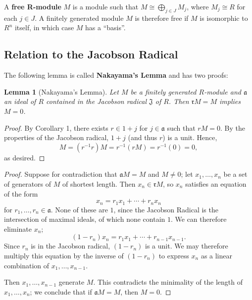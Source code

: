 \documentclass[11pt]{article}
\newtheorem{lemma}{Lemma}
\begin{document}
A \textbf{free R-module} $M$ is a module such that $M \cong \bigoplus_{j \in J} M_{j}$, where $M_{j} \cong R$ for each $j \in J$. A finitely generated module $M$ is therefore free if $M$ is isomorphic to $R^{n}$ itself, in which case $M$ has a ``basis''.

\subsection{Relation to the Jacobson Radical}


The following lemma is called \textbf{Nakayama's Lemma} and has two proofs:

\begin{adjustwidth}{0.5cm}{}
	\begin{lemma}[Nakayama's Lemma]
		Let $M$ be a finitely generated $R$-module and $\mathfrak{a}$ an ideal of $R$ contained in the Jacobson radical $\mathfrak{J}$ of $R$. Then $\mathfrak{r}M = M$ implies $M = 0$.
	\end{lemma}
	\begin{proof}
		By Corollary 1, there exists $r \in 1 + j$ for $j \in \mathfrak{a}$ such that $rM = 0$. By the properties of the Jacobson radical, $1 + j$ (and thus $r$) is a unit. Hence,
		\[
			M = (r^{-1}r)M = r^{-1}(rM) = r^{-1}(0) = 0,
		\]
		as desired.
	\end{proof}
	\begin{proof}
		Suppose for contradiction that $\mathfrak{a}M = M$ and $M \ne 0$; let $x_{1}, \ldots, x_{n}$ be a set of generators of $M$ of shortest length. Then $x_{n} \in \mathfrak{r}M$, so $x_{n}$ satisfies an equation of the form
		\[
			 x_{n} = r_{1} x_{1} + \cdots + r_{n} x_{n}
		\]
		for $r_{1}, \ldots, r_{n} \in \mathfrak{a}$. None of these are $1$, since the Jacobson Radical is the intersection of maximal ideals, of which none contain $1$. We can therefore eliminate $x_{n}$;
		\[
			(1 - r_{n})x_{n} = r_{1}x_{1} + \cdots + r_{n - 1}x_{n - 1}.
		\]
		Since $r_{n}$ is in the Jacobson radical, $(1 - r_{n})$ is a unit. We may therefore multiply this equation by the inverse of $(1 - r_{n})$ to express $x_{n}$ as a linear combination of $x_{1}, \ldots, x_{n - 1}$. 

		Then $x_{1}, \ldots, x_{n - 1}$ generate $M$. This contradicts the minimality of the length of $x_{1}, \ldots, x_{n}$; we conclude that if $\mathfrak{a} M = M$, then $M = 0$.
	\end{proof}
\end{adjustwidth}
\end{document}
